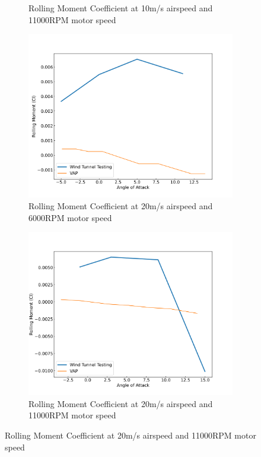 \begin{figure}[H]
\begin{subfigure}[b]{0.467\textwidth}
        \caption{Rolling Moment Coefficient at 10m/s airspeed and 11000RPM motor speed}
        \label{fig:VAP_NoProp_Cl_10ms_11000}
    \end{subfigure}
    \begin{subfigure}[b]{0.467\textwidth}
        \centering
        \includegraphics[width=\textwidth]{05_Results/VAP/noProp/Cl/20ms_6000RPM_Cl.png}
        \caption{Rolling Moment Coefficient at 20m/s airspeed and 6000RPM motor speed}
        \label{fig:VAP_NoProp_Cl_20ms_6000}
    \end{subfigure}
    \begin{subfigure}[b]{0.467\textwidth}
        \centering
        \includegraphics[width=\textwidth]{05_Results/VAP/noProp/Cl/20ms_11000RPM_Cl.png}
        \caption{Rolling Moment Coefficient at 20m/s airspeed and 11000RPM motor speed}
        \label{fig:VAP_NoProp_Cl_20ms_11000}
    \end{subfigure}
\end{figure}


